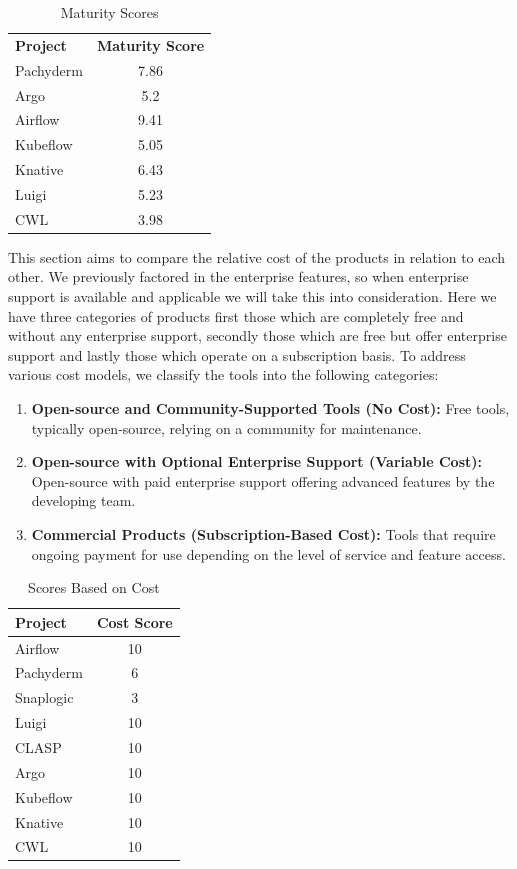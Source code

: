 \begin{table}[htb]
  \centering
  \caption{Maturity Scores}
  \begin{tabular}{|l|c|} 
    \textbf{Project} & \textbf{Maturity Score} \\
    Pachyderm  & 7.86   \\
    Argo       & 5.2  \\
    Airflow    & 9.41  \\
    Kubeflow   & 5.05  \\
    Knative    & 6.43  \\
    Luigi      & 5.23  \\
    CWL        &  3.98 \\
  \end{tabular}
\end{table}


This section aims to compare the relative cost of the products in relation to each other.
We previously factored in the enterprise features, so when enterprise support is available and applicable we will take this into consideration.
Here we have three categories of products first those which are completely free and without any enterprise support,
secondly those which are free but offer enterprise support and lastly those which operate on a subscription basis.
To address various cost models, we classify the tools into the following categories:

\begin{enumerate}
  \item \textbf{Open-source and Community-Supported Tools (No Cost):} Free tools, typically open-source, relying on a community for maintenance.
  \item \textbf{Open-source with Optional Enterprise Support (Variable Cost):} Open-source with paid enterprise support offering advanced features by the developing team.
  \item \textbf{Commercial Products (Subscription-Based Cost):} Tools that require ongoing payment for use depending on the level of service and feature access.
\end{enumerate}


\begin{table}[htb]
  \centering
  \caption{Scores Based on Cost}
  \label{tab:cost_scores}
  \begin{tabular}{|l|c|}
    \hline
    \textbf{Project} & \textbf{Cost Score} \\
    \hline
    Airflow        &  10 \\
    Pachyderm      &   6  \\
    Snaplogic      &   3  \\
    Luigi          &  10 \\
    CLASP          &  10 \\ 
    Argo           &  10 \\
    Kubeflow       &  10 \\
    Knative        &  10 \\
    CWL            &  10 \\
    \hline
  \end{tabular}
\end{table}




